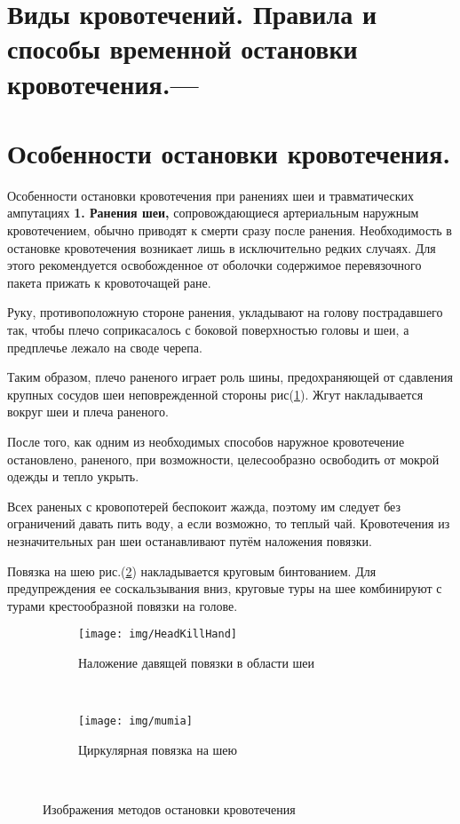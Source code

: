 \documentclass[12pt,a4paper]{report}
\begin{document}
\section{Виды кровотечений. Правила и способы временной остановки кровотечения.---}

\newpage
\section{Особенности остановки кровотечения.}{Особенности остановки кровотечения при ранениях шеи и травматических ампутациях}
\textbf{1. Ранения шеи,} сопровождающиеся артериальным наружным кровотечением, обычно приводят к смерти сразу после ранения. Необходимость в остановке кровотечения возникает лишь в исключительно редких случаях. Для этого рекомендуется освобожденное от оболочки содержимое перевязочного пакета прижать к кровоточащей ране.

Руку, противоположную стороне ранения, укладывают на голову пострадавшего так, чтобы плечо соприкасалось с боковой поверхностью головы и шеи, а предплечье лежало на своде черепа.

Таким образом, плечо раненого играет роль шины, предохраняющей от сдавления крупных сосудов шеи неповрежденной стороны рис(\ref{fig:HeadKillHand}). Жгут накладывается вокруг шеи и плеча раненого.


После того, как одним из необходимых способов наружное кровотечение остановлено, раненого, при возможности, целесообразно освободить от мокрой одежды и тепло укрыть.

Всех раненых с кровопотерей беспокоит жажда, поэтому им следует без ограничений давать пить воду, а если возможно, то теплый чай.
Кровотечения из незначительных ран шеи останавливают путём наложения повязки.

Повязка на шею рис.(\ref{fig:mumia})  накладывается круговым бинтованием. Для предупреждения ее соскальзывания вниз, круговые туры на шее комбинируют с турами крестообразной повязки на голове.

\begin{figure}[h]
	\centering
	\begin{subfigure}[b]{0.3\textwidth}
		\texttt{[image: img/HeadKillHand]}
		\caption{Наложение давящей повязки в области шеи}
		\label{fig:HeadKillHand}
	\end{subfigure}
	~ %
	\begin{subfigure}[b]{0.3\textwidth}
		\texttt{[image: img/mumia]}
		\caption{Циркулярная повязка на шею}
		\label{fig:mumia}
	\end{subfigure}
	~ %
	\caption{Изображения методов остановки кровотечения}\label{fig:tekutkakD}
\end{figure}
\end{document}

